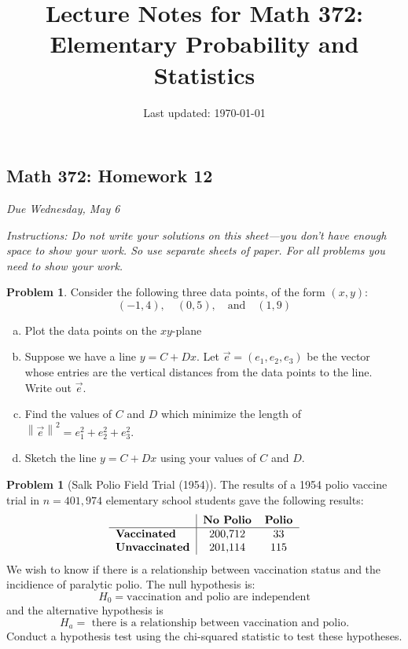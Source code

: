 \documentclass[10pt]{article}
\title{Lecture Notes for Math 372: \\Elementary Probability and Statistics}
\date{Last updated: \today}
\theoremstyle{definition}
\newtheorem{problem}[theorem]{Problem}
\newcommand{\norm}[1]{\left\lVert#1\right\rVert} %
\newcommand{\1}[1]{\textbf{1}_{\left[#1\right]}} %
\begin{document}
\begin{center}
  \section*{Math 372: Homework 12}
  \textit{Due Wednesday, May 6}
\end{center}

\textit{Instructions: Do not write your solutions on this sheet---you don't have enough space to show
your work. So use separate sheets of paper. For all problems you need to show your work.}




\begin{problem}%
  Consider the following three data points, of the form $(x,y)$:
  \begin{equation*}
    (-1,4), \quad (0,5), \quad \text{and} \quad (1,9)
  \end{equation*}
  \begin{enumerate}[(a)]
    \item Plot the data points on the $xy$-plane
    \item Suppose we have a line $y=C+Dx$. Let
    $\vec{e}= (e_{1},e_{2},e_{3})$ be the vector
    whose entries are the vertical distances from the data points to the line.
    Write out $\vec{e}$.
    \item Find the values of $C$ and $D$ which minimize the length of
    $\norm{\vec{e}}^{2}=e_{1}^{2}+e_{2}^{2}+e_{3}^{2}$.
    \item Sketch the line $y=C+Dx$ using your values of $C$ and $D$.
  \end{enumerate}
\end{problem}


\begin{problem}[Salk Polio Field Trial (1954)]
  \label{ex:salk-polio-field-trial-1954}
  The results of a 1954 polio vaccine trial in $n=401,974$ elementary school
  students gave the following results:
  \begin{equation}\label{eq:table-of-observed-values}
    \begin{tabular}{l|cc}
      & \textbf{No Polio} & \textbf{Polio} \\
      \hline
      \textbf{Vaccinated} & 200,712          & 33            \\
      \textbf{Unvaccinated}  & 201,114           & 115           
    \end{tabular} 
  \end{equation}
  We wish to know if there is a relationship between vaccination status and
  the incidience of paralytic polio. The null hypothesis is:
  \begin{equation*}
    H_{0}= \text{vaccination and polio are independent}
  \end{equation*}
  and the alternative hypothesis is
  \begin{equation*}
    H_{a} = \text{ there is a relationship between vaccination and polio.}
  \end{equation*}
  Conduct a hypothesis test using the chi-squared statistic to test these
  hypotheses.
\end{problem}
\end{document}
